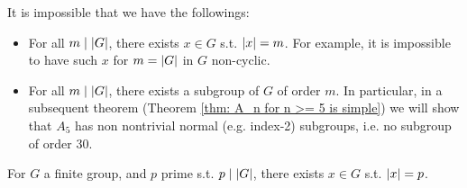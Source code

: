 \documentclass{article}
\begin{document}
It is impossible that we have the followings:
\begin{itemize}
    \item For all $m \mid \left|G\right|$, there exists $x \in G$ s.t. $\left|x\right| = m$. For example, it is impossible to have such $x$ for $m = \left|G\right|$ in $G$ non-cyclic.
    \item For all $m \mid \left|G\right|$, there exists a subgroup of $G$ of order $m$. In particular, in a subsequent theorem (Theorem \ref{thm: A_n for n >= 5 is simple}) we will show that $A_5$ has non nontrivial normal (e.g. index-2) subgroups, i.e. no subgroup of order 30.
\end{itemize}

\begin{theorem}[Cauchy]\label{thm: Cauchy}
    For $G$ a finite group, and $p$ prime s.t. $p \mid \left|G\right|$, there exists $x \in G$ s.t. $\left|x\right| = p$.
\end{theorem}
\end{document}
